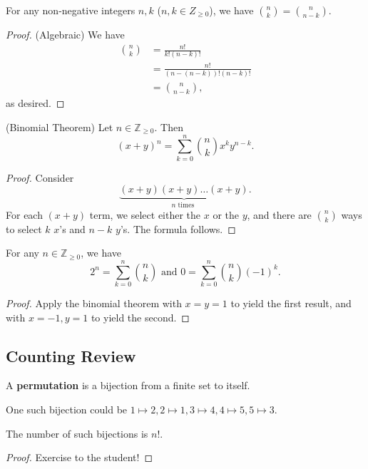 \begin{lemma}
	For any non-negative integers \( n,k \) (\( n,k \in Z_{\ge 0} \)), we have \( \binom{n}{k} = \binom{n}{n-k} \).
\end{lemma}
\begin{proof}
	(Algebraic) We have 
	\begin{align*}
		\binom{n}{k} &= \frac{n!}{k!(n-k)!} \\
								 &= \frac{n!}{(n-(n-k))!(n-k)!} \\
								 &= \binom{n}{n-k}
	,\end{align*} as desired.
\end{proof}

\begin{theorem}
	(Binomial Theorem) Let \( n \in \mathbb{Z}_{\ge 0}\). Then \[
		(x+y)^n = \sum_{k=0}^{n} \binom{n}{k} x^k y^{n-k}
	.\] 
\end{theorem}
\begin{proof}
	Consider \[ 
		\underbrace{(x+y)(x+y)\ldots (x+y)}_{n \text{ times } }
	.\] For each \( (x+y) \) term, we select either the \( x \) or the \( y \), and there are \( \binom{n}{k} \) ways to select \( k \) \( x \)'s and \( n-k \) \( y \)'s. The formula follows.
\end{proof}

\begin{corollary}
	For any \( n \in \mathbb{Z}_{\ge 0} \), we have \[ 
		2^n=\sum_{k=0}^{n} \binom{n}{k} \text{ and } 0=\sum_{k=0}^{n} \binom{n}{k} (-1)^k 
	.\]
\end{corollary}
\begin{proof}
	Apply the binomial theorem with \( x=y=1 \) to yield the first result, and with \( x=-1, y=1 \) to yield the second.
\end{proof}

\subsection{Counting Review}

\begin{definition}
	A \textbf{permutation} is a bijection from a finite set to itself.
\end{definition}

\begin{eg}
	One such bijection could be \( 1 \mapsto 2, 2 \mapsto 1, 3 \mapsto 4, 4 \mapsto 5, 5 \mapsto 3 \).
\end{eg}

\begin{lemma}
	The number of such bijections is \( n! \).
\end{lemma}
\begin{proof}
	Exercise to the student!
\end{proof}
